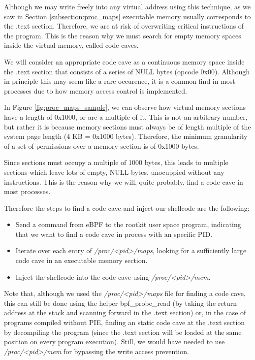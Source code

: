 Although we may write freely into any virtual address using this technique, as we saw in Section \ref{subsection:proc_maps} executable memory usually corresponds to the .text section. Therefore, we are at risk of overwriting critical instructions of the program. This is the reason why we must search for empty memory spaces inside the virtual memory, called code caves.

We will consider an appropriate code cave as a continuous memory space inside the .text section that consists of a series of NULL bytes (opcode 0x00). Although in principle this may seem like a rare occurence, it is a common find in most processes due to how memory access control is implemented.

In Figure \ref{fig:proc_maps_sample}, we can observe how virtual memory sections have a length of 0x1000, or are a multiple of it. This is not an arbitrary number, but rather it is because memory sections must always be of length multiple of the system page length (4 KB = 0x1000 bytes). Therefore, the minimum granularity of a set of permissions over a memory section is of 0x1000 bytes.

Since sections must occupy a multiple of 1000 bytes, this leads to multiple sections which leave lots of empty, NULL bytes, unocuppied without any instructions. This is the reason why we will, quite probably, find a code cave in most processes.

Therefore the steps to find a code cave and inject our shellcode are the following:
\begin{itemize}
\item Send a command from eBPF to the rootkit user space program, indicating that we want to find a code cave in process with an specific PID.
\item Iterate over each entry of \textit{/proc/<pid>/maps}, looking for a sufficiently large code cave in an executable memory section.
\item Inject the shellcode into the code cave using \textit{/proc/<pid>/mem}.
\end{itemize}

Note that, although we used the \textit{/proc/<pid>/maps} file for finding a code cave, this can still be done using the helper bpf\_probe\_read (by taking the return address at the stack and scanning forward in the .text section) or, in the case of programs compiled without PIE, finding an static code cave at the .text section by decompiling the program (since the .text section will be loaded at the same position on every program execution). Still, we would have needed to use \textit{/proc/<pid>/mem} for bypassing the write access prevention.

